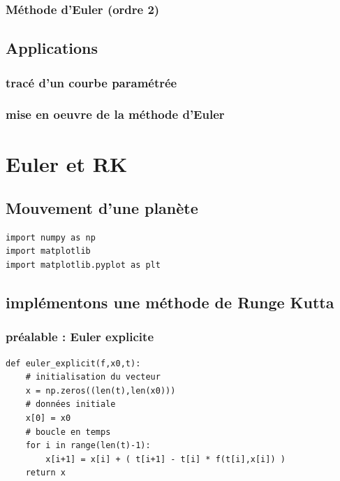 \documentclass[11pt]{article}
\begin{document}
\subsubsection{Méthode d'Euler (ordre 2)}
\label{sec:orge351ab5}


\subsection{Applications}
\label{sec:org0a2cd42}

\subsubsection{tracé d'un courbe paramétrée}
\label{sec:org372168c}

\subsubsection{mise en oeuvre de la méthode d'Euler}
\label{sec:org966e4a1}


\section{Euler et RK}
\label{sec:org52d94fd}

\subsection{Mouvement d'une planète}
\label{sec:orgce00ae9}

\begin{verbatim}
import numpy as np
import matplotlib
import matplotlib.pyplot as plt
\end{verbatim}

\subsection{implémentons une méthode de Runge Kutta}
\label{sec:org496339b}

\subsubsection{préalable : Euler explicite}
\label{sec:org17def38}

\begin{verbatim}
def euler_explicit(f,x0,t):
    # initialisation du vecteur
    x = np.zeros((len(t),len(x0)))
    # données initiale
    x[0] = x0
    # boucle en temps
    for i in range(len(t)-1):
        x[i+1] = x[i] + ( t[i+1] - t[i] * f(t[i],x[i]) )
    return x
\end{verbatim}
\end{document}
